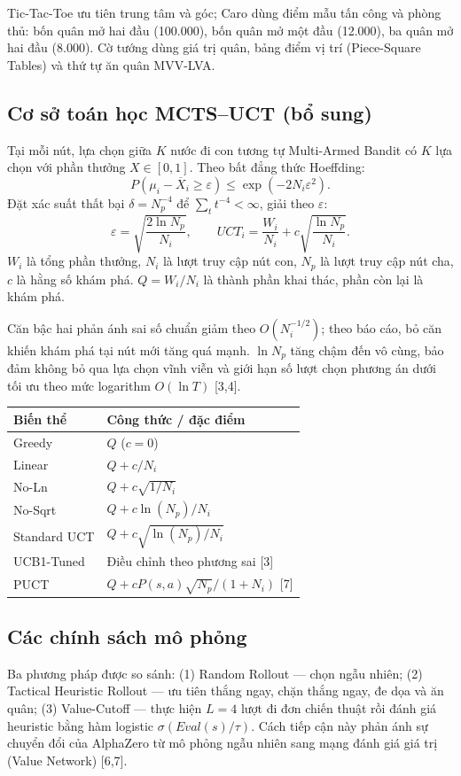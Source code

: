 \documentclass[11pt,a4paper]{article}
\begin{document}
Tic-Tac-Toe ưu tiên trung tâm và góc; Caro dùng điểm mẫu tấn công và phòng thủ: bốn quân mở hai đầu (100.000), bốn quân mở một đầu (12.000), ba quân mở hai đầu (8.000). Cờ tướng dùng giá trị quân, bảng điểm vị trí (Piece-Square Tables) và thứ tự ăn quân MVV-LVA.
\subsection{Cơ sở toán học MCTS–UCT (bổ sung)}
Tại mỗi nút, lựa chọn giữa $K$ nước đi con tương tự Multi-Armed Bandit có $K$ lựa chọn với phần thưởng $X\in[0,1]$. Theo bất đẳng thức Hoeffding:
\[P(\mu_i-\overline X_i\ge\varepsilon)\le\exp(-2N_i\varepsilon^2).\]
Đặt xác suất thất bại $\delta=N_p^{-4}$ để $\sum_t t^{-4}<\infty$, giải theo $\varepsilon$:
\[\varepsilon=\sqrt{\frac{2\ln N_p}{N_i}},\qquad \boxed{UCT_i=\frac{W_i}{N_i}+c\sqrt{\frac{\ln N_p}{N_i}}}.\]
$W_i$ là tổng phần thưởng, $N_i$ là lượt truy cập nút con, $N_p$ là lượt truy cập nút cha, $c$ là hằng số khám phá. $Q=W_i/N_i$ là thành phần khai thác, phần còn lại là khám phá.

Căn bậc hai phản ánh sai số chuẩn giảm theo $O(N_i^{-1/2})$; theo báo cáo, bỏ căn khiến khám phá tại nút mới tăng quá mạnh. $\ln N_p$ tăng chậm đến vô cùng, bảo đảm không bỏ qua lựa chọn vĩnh viễn và giới hạn số lượt chọn phương án dưới tối ưu theo mức logarithm $O(\ln T)$ [3,4].
\begin{center}\begin{tabular}{ll}\toprule Biến thể & Công thức / đặc điểm\\\midrule
Greedy & $Q$ ($c=0$)\\ Linear & $Q+c/N_i$\\ No-Ln & $Q+c\sqrt{1/N_i}$\\ No-Sqrt & $Q+c\ln(N_p)/N_i$\\ Standard UCT & $Q+c\sqrt{\ln(N_p)/N_i}$\\ UCB1-Tuned & Điều chỉnh theo phương sai [3]\\ PUCT & $Q+cP(s,a)\sqrt{N_p}/(1+N_i)$ [7]\\\bottomrule\end{tabular}\end{center}
\subsection{Các chính sách mô phỏng}
Ba phương pháp được so sánh: (1) Random Rollout — chọn ngẫu nhiên; (2) Tactical Heuristic Rollout — ưu tiên thắng ngay, chặn thắng ngay, đe dọa và ăn quân; (3) Value-Cutoff — thực hiện $L=4$ lượt đi đơn chiến thuật rồi đánh giá heuristic bằng hàm logistic $\sigma(Eval(s)/\tau)$. Cách tiếp cận này phản ánh sự chuyển đổi của AlphaZero từ mô phỏng ngẫu nhiên sang mạng đánh giá giá trị (Value Network) [6,7].
\end{document}
